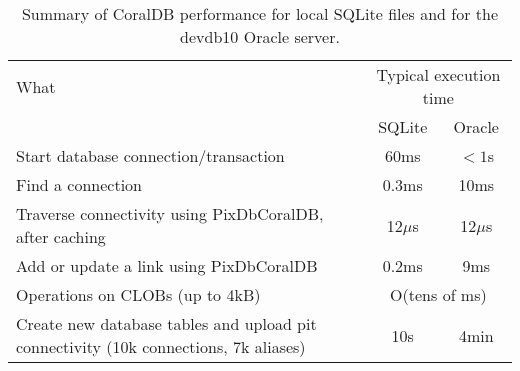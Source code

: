 \begin{table}[htb]
\begin{center}
\begin{tabular}{|p{11cm}|c|c|}
\hline
What & \multicolumn{2}{|c|}{Typical execution time} \\
& SQLite & Oracle \\ \hline
\hline
Start database connection/transaction & 60ms & $<1$s \\ \hline
Find a connection                     & 0.3ms  & 10ms  \\ \hline
Traverse connectivity using PixDbCoralDB, after caching & 12$\mu$s & 12$\mu$s \\ \hline
Add or update a link using PixDbCoralDB & 0.2ms & 9ms \\ \hline
Operations on CLOBs (up to 4kB) & \multicolumn{2}{|c|}{O(tens of ms)} \\ \hline
\hline
Create new database tables and upload pit connectivity (10k connections, 7k aliases) & 10s & 4min \\ \hline
\end{tabular}
\caption[CoralDB performance summary]
{Summary of CoralDB performance for local SQLite files and for the devdb10 Oracle server.}
\label{PERFORMANCE-table}
\end{center}
\end{table}
